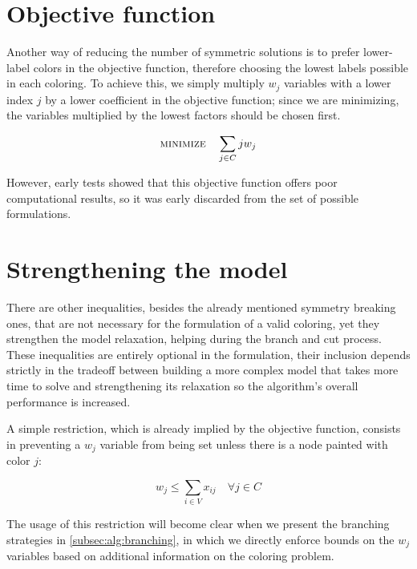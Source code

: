 \section{Objective function}
\label{subsec:model:obj}

Another way of reducing the number of symmetric solutions is to prefer lower-label colors in the objective function, therefore choosing the lowest labels possible in each coloring. To achieve this, we simply multiply $w_j$ variables with a lower index $j$ by a lower coefficient in the objective function; since we are minimizing, the variables multiplied by the lowest factors should be chosen first.

\begin{equation}
\label{eqn:objlinear}
\text{\textsc{minimize}} \quad \sum_{j \in C} j w_j 
\end{equation}

However, early tests showed that this objective function offers poor computational results, so it was early discarded from the set of possible formulations.

\section{Strengthening the model}

There are other inequalities, besides the already mentioned symmetry breaking ones, that are not necessary for the formulation of a valid coloring, yet they strengthen the model relaxation, helping during the branch and cut process. These inequalities are entirely optional in the formulation, their inclusion depends strictly in the tradeoff between building a more complex model that takes more time to solve and strengthening its relaxation so the algorithm's overall performance is increased.

A simple restriction, which is already implied by the objective function, consists in preventing a $w_j$ variable from being set unless there is a node painted with color $j$:

\begin{equation}
\label{eqn:wjleqsumcolor}
w_j \leq \sum_{i \in V} x_{ij} \quad \forall j \in C
\end{equation}

The usage of this restriction will become clear when we present the branching strategies in \ref{subsec:alg:branching}, in which we directly enforce bounds on the $w_j$ variables based on additional information on the coloring problem.

